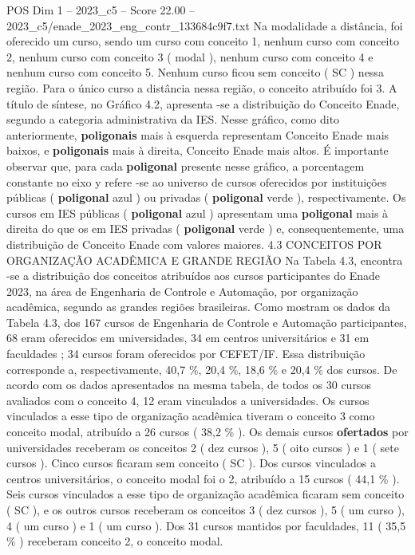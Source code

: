 \begin{textsample}{POS Dim 1 – 2023\_c5 – Score 22.00 – 2023\_c5/enade\_2023\_eng\_contr\_133684c9f7.txt}
Na modalidade a distância, foi oferecido um curso, sendo um curso com conceito 1, nenhum curso com conceito 2, nenhum curso com conceito 3 ( modal ), nenhum curso com conceito 4 e nenhum curso com conceito 5.
Nenhum curso ficou sem conceito ( SC ) nessa região.
Para o único curso a distância nessa região, o conceito atribuído foi 3.
A título de síntese, no Gráfico 4.2, apresenta -se a distribuição do Conceito Enade, segundo a categoria administrativa da IES.
Nesse gráfico, como dito anteriormente, \textbf{poligonais} mais à esquerda representam Conceito Enade mais baixos, e \textbf{poligonais} mais à direita, Conceito Enade mais altos.
É importante observar que, para cada \textbf{poligonal} presente nesse gráfico, a porcentagem constante no eixo y refere -se ao universo de cursos oferecidos por instituições públicas ( \textbf{poligonal} azul ) ou privadas ( \textbf{poligonal} verde ), respectivamente.
Os cursos em IES públicas ( \textbf{poligonal} azul ) apresentam uma \textbf{poligonal} mais à direita do que os em IES privadas ( \textbf{poligonal} verde ) e, consequentemente, uma distribuição de Conceito Enade com valores maiores. 4.3 CONCEITOS POR ORGANIZAÇÃO ACADÊMICA E GRANDE REGIÃO Na Tabela 4.3, encontra -se a distribuição dos conceitos atribuídos aos cursos participantes do Enade 2023, na área de Engenharia de Controle e Automação, por organização acadêmica, segundo as grandes regiões brasileiras.
Como mostram os dados da Tabela 4.3, dos 167 cursos de Engenharia de Controle e Automação participantes, 68 eram oferecidos em universidades, 34 em centros universitários e 31 em faculdades ; 34 cursos foram oferecidos por CEFET/IF.
Essa distribuição corresponde a, respectivamente, 40,7 \%, 20,4 \%, 18,6 \% e 20,4 \% dos cursos.
De acordo com os dados apresentados na mesma tabela, de todos os 30 cursos avaliados com o conceito 4, 12 eram vinculados a universidades.
Os cursos vinculados a esse tipo de organização acadêmica tiveram o conceito 3 como conceito modal, atribuído a 26 cursos ( 38,2 \% ).
Os demais cursos \textbf{ofertados} por universidades receberam os conceitos 2 ( dez cursos ), 5 ( oito cursos ) e 1 ( sete cursos ).
Cinco cursos ficaram sem conceito ( SC ).
Dos cursos vinculados a centros universitários, o conceito modal foi o 2, atribuído a 15 cursos ( 44,1 \% ).
Seis cursos vinculados a esse tipo de organização acadêmica ficaram sem conceito ( SC ), e os outros cursos receberam os conceitos 3 ( dez cursos ), 5 ( um curso ), 4 ( um curso ) e 1 ( um curso ).
Dos 31 cursos mantidos por faculdades, 11 ( 35,5 \% ) receberam conceito 2, o conceito modal.

\end{textsample}
